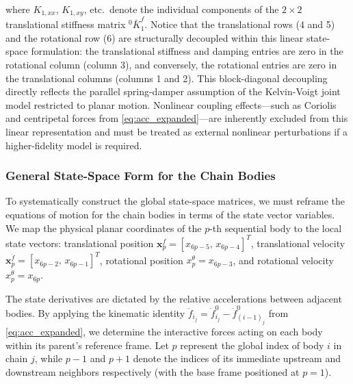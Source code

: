 \documentclass[11pt]{article}
\theoremstyle{definition}
\begin{document}
where $K_{1,xx}$, $K_{1,xy}$, etc.\ denote the individual components of the $2\times2$ translational stiffness matrix ${}^0\bar{K}^f_1$. Notice that the translational rows (4 and 5) and the rotational row (6) are structurally decoupled within this linear state-space formulation: the translational stiffness and damping entries are zero in the rotational column (column 3), and conversely, the rotational entries are zero in the translational columns (columns 1 and 2). This block-diagonal decoupling directly reflects the parallel spring-damper assumption of the Kelvin-Voigt joint model restricted to planar motion. Nonlinear coupling effects---such as Coriolis and centripetal forces from \eqref{eq:acc_expanded}---are inherently excluded from this linear representation and must be treated as external nonlinear perturbations if a higher-fidelity model is required.

\subsubsection{General State-Space Form for the Chain Bodies}

To systematically construct the global state-space matrices, we must reframe the equations of motion for the chain bodies in terms of the state vector variables. We map the physical planar coordinates of the $p$-th sequential body to the local state vectors: translational position $\mathbf{x}_{p}^f = [x_{6p-5},\, x_{6p-4}]^T$, translational velocity $\mathbf{x}_{p}^{\dot{f}} = [x_{6p-2},\, x_{6p-1}]^T$, rotational position $x_{p}^{\theta} = x_{6p-3}$, and rotational velocity $x_{p}^{\dot{\theta}} = x_{6p}$.

The state derivatives are dictated by the relative accelerations between adjacent bodies. By applying the kinematic identity $\ddot{f}_{i_j} = \ddot{f}^0_{i_j} - \ddot{f}^0_{(i-1)_j}$ from \eqref{eq:acc_expanded}, we determine the interactive forces acting on each body within its parent's reference frame. Let $p$ represent the global index of body $i$ in chain $j$, while $p-1$ and $p+1$ denote the indices of its immediate upstream and downstream neighbors respectively (with the base frame positioned at $p=1$). 
\end{document}
